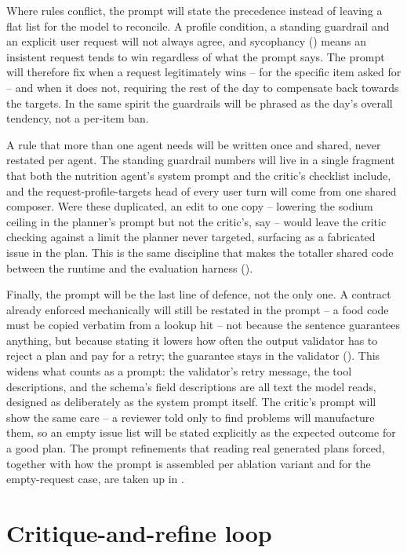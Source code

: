 Where rules conflict, the prompt will state the precedence instead of leaving a flat list for the model to reconcile. A profile condition, a standing guardrail and an explicit user request will not always agree, and sycophancy () means an insistent request tends to win regardless of what the prompt says. The prompt will therefore fix when a request legitimately wins -- for the specific item asked for -- and when it does not, requiring the rest of the day to compensate back towards the targets. In the same spirit the guardrails will be phrased as the day's overall tendency, not a per-item ban.

A rule that more than one agent needs will be written once and shared, never restated per agent. The standing guardrail numbers will live in a single fragment that both the nutrition agent's system prompt and the critic's checklist include, and the request-profile-targets head of every user turn will come from one shared composer. Were these duplicated, an edit to one copy -- lowering the sodium ceiling in the planner's prompt but not the critic's, say -- would leave the critic checking against a limit the planner never targeted, surfacing as a fabricated issue in the plan. This is the same discipline that makes the totaller shared code between the runtime and the evaluation harness ().

Finally, the prompt will be the last line of defence, not the only one. A contract already enforced mechanically will still be restated in the prompt -- a food code must be copied verbatim from a lookup hit -- not because the sentence guarantees anything, but because stating it lowers how often the output validator has to reject a plan and pay for a retry; the guarantee stays in the validator (). This widens what counts as a prompt: the validator's retry message, the tool descriptions, and the schema's field descriptions are all text the model reads, designed as deliberately as the system prompt itself. The critic's prompt will show the same care -- a reviewer told only to find problems will manufacture them, so an empty issue list will be stated explicitly as the expected outcome for a good plan. The prompt refinements that reading real generated plans forced, together with how the prompt is assembled per ablation variant and for the empty-request case, are taken up in .

\section{Critique-and-refine loop}
\label{sec:design-reflection}

